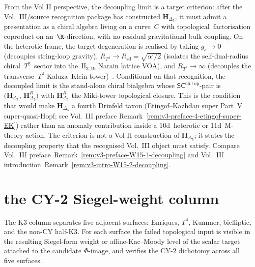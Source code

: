 \begin{remark}
\label{rem:wac-W15-3-decoupling}
From the Vol II perspective, the decoupling limit is a target criterion:
after the Vol.~III/source recognition package has constructed
\(\mathbf{H}_{\Delta_5}\), it must admit a presentation as a chiral algebra
living on a curve~$C$ with topological~factorisation coproduct on
an~$\R$-direction, with no residual gravitational bulk coupling. On the
heterotic frame, the target degeneration is realised by taking
$g_s \to 0$ (decouples string-loop gravity),
$R_{T^2}\to R_{\mathrm{sd}} = \sqrt{\alpha'/2}$ (isolates the
self-dual-radius chiral~$T^2$~sector into the~$\mathrm{II}_{3,19}$
Narain lattice VOA), and $R_{T^4}\to\infty$ (decouples the
transverse~$T^4$ Kaluza--Klein tower)~\cite{HarveyMoore1996,
NahmWendland2001,TaorminaWendland2011}. Conditional on that recognition,
the decoupled limit is the stand-alone chiral bialgebra whose
$\mathsf{SC}^{\mathrm{ch,top}}$-pair is
$\bigl(\mathbf{H}_{\Delta_5},\,\mathbf{H}_{\Delta_5}^{R}\bigr)$
with $\mathbf{H}_{\Delta_5}^{R}$ the Miki-tower topological
closure. This is the condition that would make \(\mathbf H_{\Delta_5}\) a
fourth Drinfeld taxon (Etingof--Kazhdan super Part~V super-quasi-Hopf; see
Vol.~III preface Remark~\ref{rem:v3-preface-4-etingof-super-EK}) rather
than an anomaly contribution inside a 10d~heterotic or 11d~M-theory action.
The criterion is not a Vol II construction of \(\mathbf H_{\Delta_5}\); it
states the decoupling property that the recognised Vol.~III object must
satisfy. Compare
Vol.~III preface~Remark~\ref{rem:v3-preface-W15-1-decoupling}
and Vol.~III introduction~Remark~\ref{rem:v3-intro-W15-2-decoupling}.
\end{remark}

\section{the CY-2 Siegel-weight column}
\label{sec:wac-supplement-iii}

The K3 column separates five adjacent surfaces: Enriques, $T^4$,
Kummer, bielliptic, and the non-CY half-K3. For each surface the
failed topological input is visible in the resulting
Siegel-form weight or affine-Kac--Moody level of the scalar target
attached to the candidate $\Phi$-image, and verifies the CY-$2$
dichotomy across all five surfaces.

